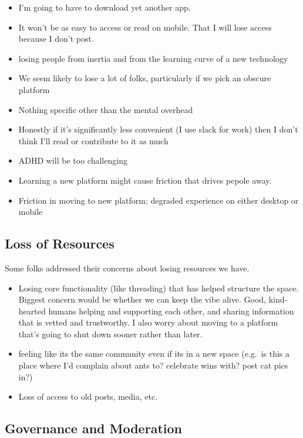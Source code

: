 \documentclass[
]{book}
\providecommand{\tightlist}{%
  \setlength{\itemsep}{0pt}\setlength{\parskip}{0pt}}
\begin{document}
\begin{itemize}
\item
  I'm going to have to download yet another app.
\item
  It won't be as easy to access or read on mobile. That I will lose access because I don't post.
\item
  losing people from inertia and from the learning curve of a new technology
\item
  We seem likely to lose a lot of folks, particularly if we pick an obscure platform
\item
  Nothing specific other than the mental overhead
\item
  Honestly if it's significantly less convenient (I use slack for work) then I don't think I'll read or contribute to it as much
\item
  ADHD will be too challenging
\item
  Learning a new platform might cause friction that drives pepole away.
\item
  Friction in moving to new platform; degraded experience on either desktop or mobile
\end{itemize}

\subsection{Loss of Resources}\label{loss-of-resources-1}

Some folks addressed their concerns about losing resources we have.

\begin{itemize}
\tightlist
\item
  Losing core functionality (like threading) that has helped structure the space. Biggest concern would be whether we can keep the vibe alive. Good, kind-hearted humans helping and supporting each other, and sharing information that is vetted and trustworthy. I also worry about moving to a platform that's going to shut down sooner rather than later.
\item
  feeling like its the same community even if its in a new space (e.g.~is this a place where I'd complain about ants to? celebrate wins with? post cat pics in?)
\item
  Loss of access to old posts, media, etc.
\end{itemize}

\subsection{Governance and Moderation}\label{governance-and-moderation}
\end{document}
